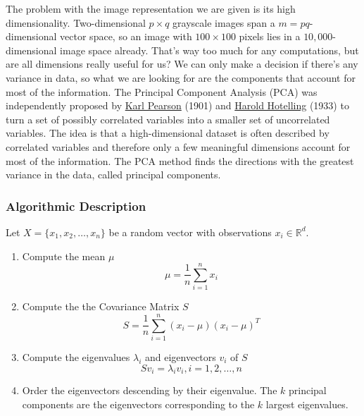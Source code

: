 \lstset{language=matlab}

The problem with the image representation we are given is its high dimensionality. Two-dimensional $p \times q$ grayscale images span a $m = pq$-dimensional vector space, so an image with $100 \times 100$ pixels lies in a $10,000$-dimensional image space already. That's way too much for any computations, but are all dimensions really useful for us? We can only make a decision if there's any variance in data, so what we are looking for are the components that account for most of the information. The Principal Component Analysis (PCA) was independently proposed by \href{http://en.wikipedia.org/wiki/Karl_Pearson}{Karl Pearson} (1901) and \href{http://en.wikipedia.org/wiki/Harold_Hotelling}{Harold Hotelling} (1933) to turn a set of possibly correlated variables into a smaller set of uncorrelated variables. The idea is that a high-dimensional dataset is often described by correlated variables and therefore only a few meaningful dimensions account for most of the information. The PCA method finds the directions with the greatest variance in the data, called principal components.

\subsubsection{Algorithmic Description}

\label{ssection:pca_algorithm}

Let $X = \{ x_{1}, x_{2}, \ldots, x_{n} \}$ be a random vector with observations $x_i \in \mathbb{R}^{d}$.

\begin{enumerate}
	\item Compute the mean $\mu$
		\begin{equation} \label{eqn:pca_mean}
			\mu = \frac{1}{n} \sum_{i=1}^{n} x_{i}
		\end{equation}
	\item Compute the the Covariance Matrix $S$
		\begin{equation} \label{eqn:pca_cov}
			S = \frac{1}{n} \sum_{i=1}^{n} (x_{i} - \mu) (x_{i} - \mu)^{T}
		\end{equation}
	\item Compute the eigenvalues $\lambda_{i}$ and eigenvectors $v_{i}$ of $S$
		\begin{equation}  \label{eqn:pca_eigenvalues}
			S v_{i} = \lambda_{i} v_{i}, i=1,2,\ldots,n
		\end{equation}
	\item Order the eigenvectors descending by their eigenvalue. The $k$ principal components are the eigenvectors corresponding to the $k$ largest eigenvalues.
\end{enumerate}

